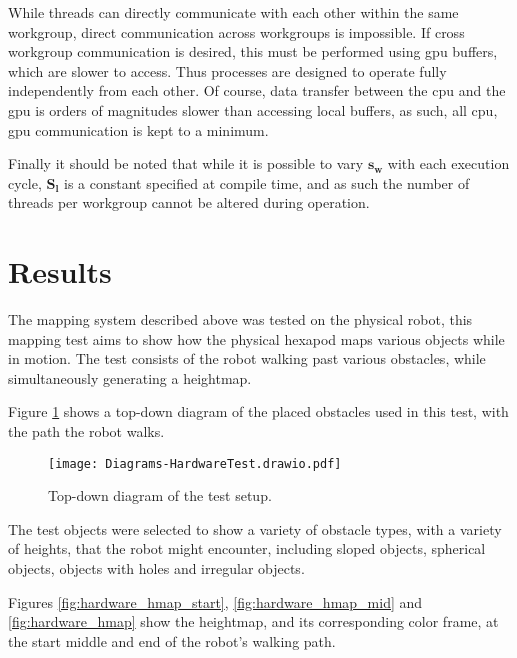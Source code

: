            While threads can directly communicate with each other within the same workgroup, direct communication across workgroups is
            impossible. If cross workgroup communication is desired, this must be performed using \ac{gpu} buffers, which are slower to access. Thus processes are
            designed to operate fully independently from each other. Of course, data transfer between the \ac{cpu} and the \ac{gpu} is orders of magnitudes
            slower than accessing local buffers, as such, all \ac{cpu}, \ac{gpu} communication is kept to a minimum.
            
            Finally it should be noted that while it is possible to vary \(\bm{s_w}\) with each execution cycle, \(\bm{S_l}\) is a constant specified at compile time,
            and as such the number of threads per workgroup cannot be altered during operation.

    \newpage
    \section{Results}
        The mapping system described above was tested on the physical robot, this mapping test aims to show how the physical hexapod maps various objects while in motion.
        The test consists of the robot walking past various obstacles, while simultaneously generating a heightmap.

        Figure \ref{fig:hardware_map_diag} shows a top-down diagram of the placed obstacles used in this test, with the path the robot walks.
        \begin{figure}[h]
            \centering
            \texttt{[image: Diagrams-HardwareTest.drawio.pdf]}
            \caption{Top-down diagram of the test setup.}
            \label{fig:hardware_map_diag}
        \end{figure}

        \noindent
        The test objects were selected to show a variety of obstacle types, with a variety of heights, that the robot might encounter, including sloped objects, spherical objects, objects
        with holes and irregular objects. 

        Figures \ref{fig:hardware_hmap_start}, \ref{fig:hardware_hmap_mid} and \ref{fig:hardware_hmap} show the heightmap, and its corresponding color frame, at the start middle and end of the
        robot's walking path.
        
